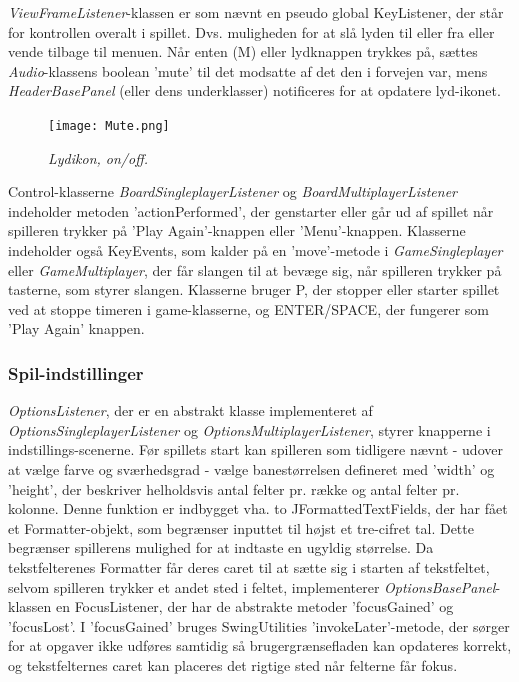 \textit{ViewFrameListener}-klassen er som nævnt en pseudo global KeyListener, der står for kontrollen overalt i spillet. Dvs. muligheden for at slå lyden til eller fra eller vende tilbage til menuen. Når enten (M) eller lydknappen trykkes på, sættes \textit{Audio}-klassens boolean 'mute' til det modsatte af det den i forvejen var, mens \textit{HeaderBasePanel} (eller dens underklasser) notificeres for at opdatere lyd-ikonet.

\begin{figure}[h]
	\centering
   	\texttt{[image: Mute.png]}
	\caption{\textit{Lydikon, on/off.}}
\end{figure}

Control-klasserne \textit{BoardSingleplayerListener} og \textit{BoardMultiplayerListener} indeholder metoden 'actionPerformed', der genstarter eller går ud af spillet når spilleren trykker på 'Play Again'-knappen eller 'Menu'-knappen. Klasserne indeholder også KeyEvents, som kalder på en 'move'-metode i \textit{GameSingleplayer} eller \textit{GameMultiplayer}, der får slangen til at bevæge sig, når spilleren trykker på tasterne, som styrer slangen. Klasserne bruger P, der stopper eller starter spillet ved at stoppe timeren i game-klasserne, og ENTER/SPACE, der fungerer som 'Play Again' knappen.
\newline

\subsubsection{Spil-indstillinger}
\textit{OptionsListener}, der er en abstrakt klasse implementeret af \textit{OptionsSingleplayerListener} og \textit{OptionsMultiplayerListener}, styrer knapperne i indstillings-scenerne. Før spillets start kan spilleren som tidligere nævnt - udover at vælge farve og sværhedsgrad - vælge banestørrelsen defineret med 'width' og 'height', der beskriver helholdsvis antal felter pr. række og antal felter pr. kolonne. Denne funktion er indbygget vha. to JFormattedTextFields, der har fået et Formatter-objekt, som begrænser inputtet til højst et tre-cifret tal. Dette begrænser spillerens mulighed for at indtaste en ugyldig størrelse. Da tekstfelterenes Formatter får deres caret til at sætte sig i starten af tekstfeltet, selvom spilleren trykker et andet sted i feltet, implementerer \textit{OptionsBasePanel}-klassen en FocusListener, der har de abstrakte metoder 'focusGained' og 'focusLost'. I 'focusGained' bruges SwingUtilities 'invokeLater'-metode, der sørger for at opgaver ikke udføres samtidig så brugergrænsefladen kan opdateres korrekt, og tekstfelternes caret kan placeres det rigtige sted når felterne får fokus.
\newline

